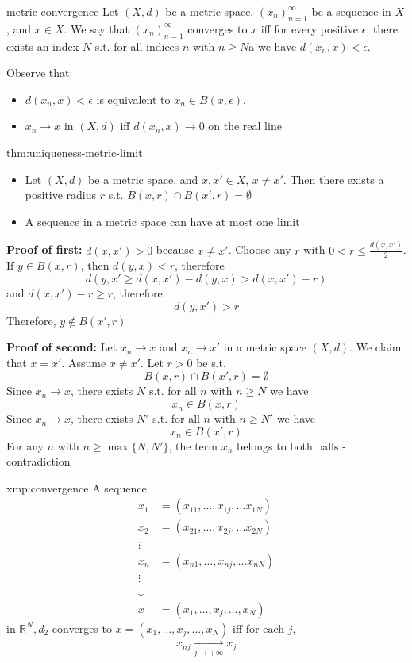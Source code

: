\documentclass{article}
\begin{document}
\begin{dfn}{metric-convergence}{}
    Let $(X,d)$ be a metric space, $(x_{n})^{\infty}_{n=1}$ be a sequence in $X$, and $x\in X$. We say that $(x_{n})^{\infty}_{n=1}$ converges to $x$ iff for every positive $\epsilon$, there exists an index $N$ s.t. for all indices $n$ with $n\ge N$a we have $d(x_{n}, x) < \epsilon$.

    Observe that:
    \begin{itemize}
        \item $d(x_{n}, x)< \epsilon$ is equivalent to $x_{n}\in B(x,\epsilon)$.
        \item $x_{n}\to x$ in $(X,d)$ iff $d(x_{n}, x)\to 0$ on the real line
    \end{itemize}
\end{dfn}

\begin{thm}{thm:uniqueness-metric-limit}{}
    \begin{itemize}
        \item Let $(X,d)$ be a metric space, and $x,x'\in X,\,x\ne x'$. Then there exists a positive radius $r$ s.t. $B(x,r)\cap B(x',r) = \emptyset$
        \item A sequence in a metric space can have at most one limit
    \end{itemize}
\end{thm}

\textbf{Proof of first:} $d(x,x') > 0$ because $x \ne x'$. Choose any $r$ with $0  < r \le \frac{d(x,x')}{2}$. If $y\in B(x,r)$, then $d(y,x)<r$, therefore
\[d(y,x' \ge d(x,x') - d(y,x) > d(x,x') - r)\]
and $d(x,x') - r \ge r$, therefore
\[d(y,x') > r\]
Therefore, $y\not\in B(x', r)$

\textbf{Proof of second: } Let $x_{n} \to x$ and $x_{n}\to x'$ in a metric space $(X,d)$. We claim that $x = x'$.
Assume $x\ne x'$. Let $r > 0$ be s.t.
\[B(x,r) \cap B(x',r) = \emptyset\]
Since $x_{n}\to x$, there exists $N$ s.t. for all $n$ with $n \ge N$ we have
\[x_{n} \in B(x,r)\]
Since $x_{n}\to x$, there exists $N'$ s.t. for all $n$ with $n \ge N'$ we have
\[x_{n} \in B(x',r)\]
For any $n$ with $n \ge \max \{N, N'\}$, the term $x_{n}$ belongs to both balls - contradiction

\newpage
\begin{xmp}{xmp:convergence}{}
    A sequence
    \begin{align*}
        x_{1} &= (x_{11}, \dots,x_{1j}, \dots x_{1N}) \\
        x_{2} &= (x_{21}, \dots,x_{2j}, \dots x_{2N}) \\
        \vdots & \\
        x_{n} &= (x_{n1}, \dots,x_{nj}, \dots x_{nN}) \\
        \vdots \\
        \downarrow \\
        x &= (x_{1}, \dots, x_{j}, \dots, x_{N})
    \end{align*}
    in $\mathbb{R}^{N}, d_{2}$ converges to $x = (x_{1}, \dots, x_{j}, \dots, x_{N})$ iff for each $j$,
    \[x_{nj}\xrightarrow[j\to+\infty]{} x_{j}\]
\end{xmp}
\end{document}
